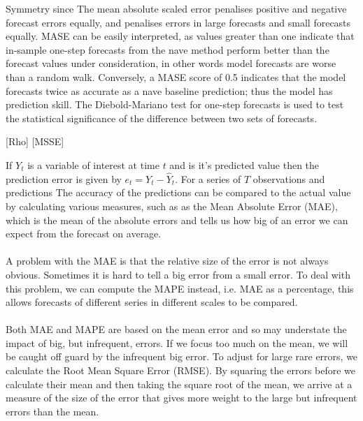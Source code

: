 Symmetry since The mean absolute scaled error penalises positive and negative forecast errors equally, and penalises errors in large forecasts and small forecasts equally. MASE can be easily interpreted, as values greater than one indicate that in-sample one-step forecasts from the nave method perform better than the forecast values under consideration, in other words model forecasts are worse than a random walk. Conversely, a MASE score of 0.5 indicates that the model forecasts twice as accurate as a nave baseline prediction; thus the model has prediction skill. The Diebold-Mariano test for one-step forecasts is used to test the statistical significance of the difference between two sets of forecasts. 


[Rho]
[MSSE]

\iffalse
If $Y_t$ is a variable of interest at time $t$ and  is it's predicted value then the prediction error is given by $e_t = Y_t - \hat{Y}_t$. For a series of $T$ observations and predictions The accuracy of the predictions can be compared to the actual value by calculating various measures, such as as the Mean Absolute Error (MAE), which is the mean of the absolute errors and tells us how big of an error we can expect from the forecast on average. \\

 \\

A problem with the MAE is that the relative size of the error is not always obvious. Sometimes it is hard to tell a big error from a small error. To deal with this problem, we can compute the MAPE instead, i.e. MAE as a percentage, this allows forecasts of different series in different scales to be compared.\\

\\

Both MAE and MAPE are based on the mean error and so may understate the impact of big, but infrequent, errors. If we focus too much on the mean, we will be caught off guard by the infrequent big error. To adjust for large rare errors, we calculate the Root Mean Square Error (RMSE). By squaring the errors before we calculate their mean and then taking the square root of the mean, we arrive at a measure of the size of the error that gives more weight to the large but infrequent errors than the mean.\\


